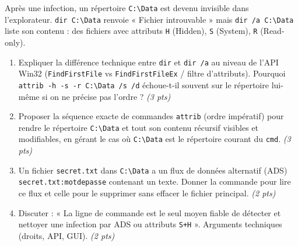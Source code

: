 \documentclass[11pt]{article}
\begin{document}
\begin{exercice}
Après une infection, un répertoire \texttt{C:\textbackslash Data} est devenu invisible dans l'explorateur. \texttt{dir C:\textbackslash Data} renvoie « Fichier introuvable » mais \texttt{dir /a C:\textbackslash Data} liste son contenu : des fichiers avec attributs \texttt{H} (Hidden), \texttt{S} (System), \texttt{R} (Read-only).
\begin{enumerate}
    \item Expliquer la différence technique entre \texttt{dir} et \texttt{dir /a} au niveau de l'API Win32 (\texttt{FindFirstFile} vs \texttt{FindFirstFileEx} / filtre d'attributs). Pourquoi \texttt{attrib -h -s -r C:\textbackslash Data /s /d} échoue-t-il souvent sur le répertoire lui-même si on ne précise pas l'ordre ? \textit{(3 pts)}
    \item Proposer la séquence exacte de commandes \texttt{attrib} (ordre impératif) pour rendre le répertoire \texttt{C:\textbackslash Data} et tout son contenu récursif visibles et modifiables, en gérant le cas où \texttt{C:\textbackslash Data} est le répertoire courant du \texttt{cmd}. \textit{(3 pts)}
    \item Un fichier \texttt{secret.txt} dans \texttt{C:\textbackslash Data} a un flux de données alternatif (ADS) \texttt{secret.txt:motdepasse} contenant un texte. Donner la commande pour lire ce flux et celle pour le supprimer sans effacer le fichier principal. \textit{(2 pts)}
    \item Discuter : « La ligne de commande est le seul moyen fiable de détecter et nettoyer une infection par ADS ou attributs \texttt{S+H} ». Arguments techniques (droits, API, GUI). \textit{(2 pts)}
\end{enumerate}
\end{exercice}
\end{document}
